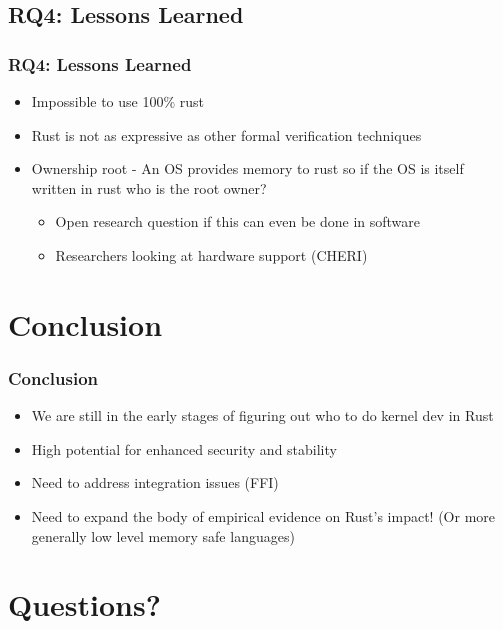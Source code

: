 \documentclass{beamer}
\begin{document}
\subsection{RQ4: Lessons Learned}

\begin{frame}
  \frametitle{RQ4: Lessons Learned}
  \begin{itemize}
  \item<1-> Impossible to use 100$\%$ rust
  \item<2-> Rust is not as expressive as other formal verification techniques
  \item<3-> Ownership root - An OS provides memory to rust so if the OS is itself written in rust
    who is the root owner?
    \begin{itemize}
    \item Open research question if this can even be done in software
    \item Researchers looking at hardware support (CHERI)
    \end{itemize}
  \end{itemize}

\end{frame}


\section{Conclusion}

\begin{frame}
  \frametitle{Conclusion}
  \begin{itemize}
  \item<1-> We are still in the early stages of figuring out who to do kernel dev in Rust
  \item<2-> High potential for enhanced security and stability
  \item<3-> Need to address integration issues (FFI)
  \item<4-> Need to expand the body of empirical evidence on Rust's impact! (Or more generally low
    level memory safe languages)
  \end{itemize}

\end{frame}

\section{Questions?}
\end{document}
